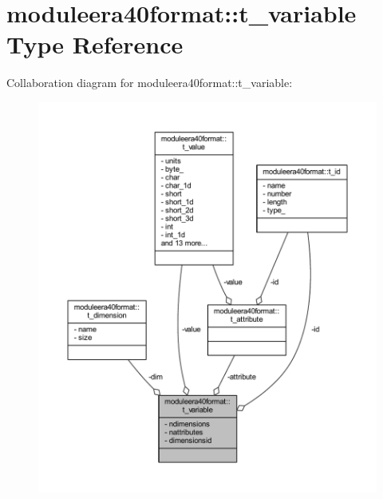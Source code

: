 \hypertarget{structmoduleera40format_1_1t__variable}{}\section{moduleera40format\+:\+:t\+\_\+variable Type Reference}
\label{structmoduleera40format_1_1t__variable}


Collaboration diagram for moduleera40format\+:\+:t\+\_\+variable\+:\nopagebreak
\begin{figure}[H]
\begin{center}
\leavevmode
\includegraphics[width=350pt]{structmoduleera40format_1_1t__variable__coll__graph}
\end{center}
\end{figure}
